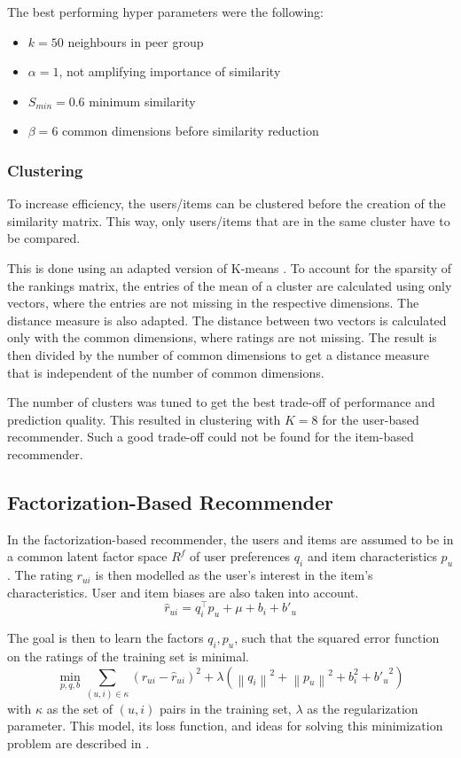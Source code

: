 \documentclass[sigconf]{acmart}
\newcommand{\norm}[1]{\left\| #1 \right\|}
\def\T{\top}
\begin{document}
The best performing hyper parameters were the following:
\begin{itemize}
	\item $k = 50$ neighbours in peer group
	\item $\alpha = 1$, not amplifying importance of similarity
	\item $S_{min} = 0.6$ minimum similarity
	\item $\beta = 6$ common dimensions before similarity reduction
\end{itemize}


\subsubsection{Clustering}
\label{sec:methods:neighbourhood:clustering}
To increase efficiency, the users/items can be clustered before the creation of the similarity matrix. This way, only users/items that are in the same cluster have to be compared.

This is done using an adapted version of K-means \cite[Chapter~2, Section~4]{Aggarwal2016}.
To account for the sparsity of the rankings matrix, the entries of the mean of a cluster are calculated using only vectors, where the entries are not missing in the respective dimensions.
The distance measure is also adapted. The distance between two vectors is calculated only with the common dimensions, where ratings are not missing.
The result is then divided by the number of common dimensions to get a distance measure that is independent of the number of common dimensions.

The number of clusters was tuned to get the best trade-off of performance and prediction quality.
This resulted in clustering with $K = 8$ for the user-based recommender.
Such a good trade-off could not be found for the item-based recommender.


\subsection[Factorization]{Factorization-Based Recommender}
\label{sec:methods:factorization}
In the factorization-based recommender, the users and items are assumed to be in a common latent factor space $R^f$ of user preferences $q_i$ and item characteristics $p_u$.
The rating $r_{ui}$ is then modelled as the user's interest in the item's characteristics. User and item biases are also taken into account.
$$\hat{r}_{ui} = q_i^\T p_u + \mu + b_i + b'_u$$

The goal is then to learn the factors $q_i, p_u$, such that the squared error function on the ratings of the training set is minimal.
$$\min\limits_{p, q, b} \sum\limits_{(u, i) \in \kappa} (r_{ui} - \hat{r}_{ui})^2 + \lambda \left(\norm{q_i}^2 + \norm{p_u}^2 + b_i^2 + {b'_u}^2\right)$$
with $\kappa$ as the set of $(u, i)$ pairs in the training set, $\lambda$ as the regularization parameter.
This model, its loss function, and ideas for solving this minimization problem are described in \cite{Koren2009}.
\end{document}
